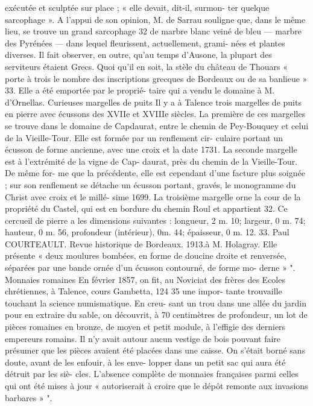 \documentclass[a4paper,11pt]{book}
\begin{document}
exécutée et sculptée sur place ; « elle devait, dit-il, surmon-
ter quelque sarcophage ». A l'appui de son opinion, M. de
Sarrau souligne que, dans le même lieu, se trouve un grand
sarcophage 32 de marbre blanc veiné de bleu — marbre des
Pyrénées
— dans lequel fleurissent, actuellement, grami-
nées et plantes diverses. Il fait observer, en outre, qu'au
temps d'Ausone, la plupart des serviteurs étaient Grecs.
Quoi qu'il en soit, la stèle du château de Thouars « porte
à trois le nombre des inscriptions grecques de Bordeaux
ou de sa banlieue » 33. Elle a été emportée par le proprié-
taire qui a vendu le domaine à M. d'Ornellas.
Curieuses margelles de puits
Il y a à Talence trois margelles de puits en pierre avec
écussons des XVIIe et XVIIIe siècles.
La première de ces margelles se trouve dans le domaine
de Capdaurat, entre le chemin de Pey-Bouquey et celui
de la Vieille-Tour. Elle est formée par un renflement cir-
culaire portant un écusson de forme ancienne, avec une
croix et la date 1731.
La seconde margelle est à l'extrémité de la vigne de Cap-
daurat, près du chemin de la Vieille-Tour. De même for-
me que la précédente, elle est cependant d'une facture plus
soignée ; sur son renflement se détache un écusson portant,
gravés, le monogramme du Christ avec croix et le millé-
sime 1699.
La troisième margelle orne la cour de la propriété du
Castel, qui est en bordure du chemin Roul et appartient
32. Ce cercueil de pierre a les dimensions suivantes : longueur,
2 m. 10; largeur, 0 m. 74; hauteur, 0 m. 56, profondeur (intérieur), 0m. 44;
épaisseur, 0 m. 12.
33. Paul COURTEAULT. Revue historique de Bordeaux. 1913.à M. Holagray. Elle présente « deux moulures bombées,
en forme de doucine droite et renversée, séparées par une
bande ornée d'un écusson contourné, de forme mo-
derne » ".
Monnaies romaines
En février 1857, on fit, au Noviciat des frères des Ecoles
chrétiennes, à Talence, cours Gambetta, 124 35 une impor-
tante trouvaille touchant la science numismatique. En creu-
sant un trou dans une allée du jardin pour en extraire
du sable, on découvrit, à 70 centimètres de profondeur,
un lot de pièces romaines en bronze, de moyen et petit
module, à l'effigie des derniers empereurs romains. Il n'y
avait autour aucun vestige de bois pouvant faire présumer
que les pièces avaient été placées dans une caisse. On
s'était borné sans doute, avant de les enfouir, à les enve-
lopper dans un petit sac qui aura été détruit par les siè-
cles. L'absence complète de monnaies françaises parmi
celles qui ont été mises à jour « autoriserait à croire que
le dépôt remonte aux invasions barbares » ".
\end{document}
